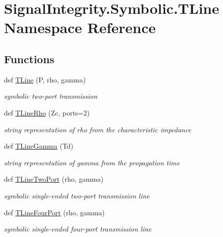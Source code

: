 \hypertarget{namespaceSignalIntegrity_1_1Symbolic_1_1TLine}{}\section{Signal\+Integrity.\+Symbolic.\+T\+Line Namespace Reference}
\label{namespaceSignalIntegrity_1_1Symbolic_1_1TLine}
\subsection*{Functions}
\begin{DoxyCompactItemize}
\item 
def \hyperlink{namespaceSignalIntegrity_1_1Symbolic_1_1TLine_ab6b9daac20a1c798e782aa9af3a6e44f}{T\+Line} (P, rho, gamma)
\begin{DoxyCompactList}\small\item\em symbolic two-\/port transmission \end{DoxyCompactList}\item 
def \hyperlink{namespaceSignalIntegrity_1_1Symbolic_1_1TLine_a6e67758dfbb8c37100cd86a52783b20c}{T\+Line\+Rho} (Zc, ports=2)
\begin{DoxyCompactList}\small\item\em string representation of rho from the characteristic impedance \end{DoxyCompactList}\item 
def \hyperlink{namespaceSignalIntegrity_1_1Symbolic_1_1TLine_a1789044d24922e3256a701fa4cca3717}{T\+Line\+Gamma} (Td)
\begin{DoxyCompactList}\small\item\em string representation of gamma from the propagation time \end{DoxyCompactList}\item 
def \hyperlink{namespaceSignalIntegrity_1_1Symbolic_1_1TLine_a03366e71575a7dda96f6cba322d2ffce}{T\+Line\+Two\+Port} (rho, gamma)
\begin{DoxyCompactList}\small\item\em symbolic single-\/ended two-\/port transmission line \end{DoxyCompactList}\item 
def \hyperlink{namespaceSignalIntegrity_1_1Symbolic_1_1TLine_a43ac4b6d4a984f5b43421e22cbf6a92c}{T\+Line\+Four\+Port} (rho, gamma)
\begin{DoxyCompactList}\small\item\em symbolic single-\/ended four-\/port transmission line \end{DoxyCompactList}\end{DoxyCompactItemize}


